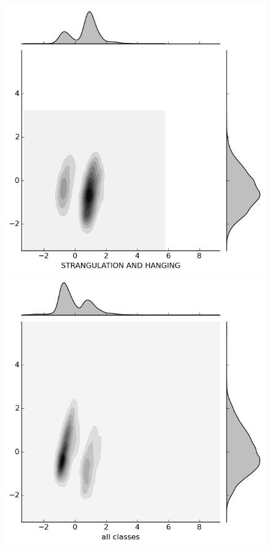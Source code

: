 \begin{figure}[H]
  \begin{minipage}[b]{0.20\linewidth}
    \includegraphics[width=\linewidth]{images/weapon/STRANGULATION.png}
  \end{minipage}
  \quad
  \begin{minipage}[b]{0.20\linewidth}
    \includegraphics[width=\linewidth]{images/weapon/all.png}
  \end{minipage}
  

\end{figure}
